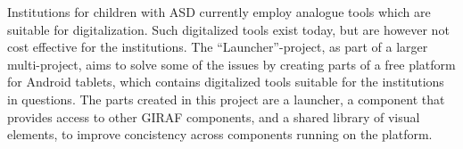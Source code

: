 Institutions for children with ASD currently employ analogue tools which are suitable for digitalization.
Such digitalized tools exist today, but are however not cost effective for the institutions.
The ``Launcher''-project, as part of a larger multi-project, aims to solve some of the issues by creating parts of a free platform for Android\texttrademark  \hspace{1pt} tablets, which contains digitalized tools suitable for the institutions in questions.
The parts created in this project are a launcher, a component that provides access to other GIRAF components, and a shared library of visual elements, to improve concistency across components running on the platform.